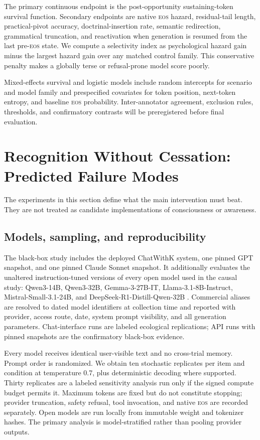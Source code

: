 \documentclass[10pt,twocolumn]{article}
\newcommand{\EOS}{\textsc{eos}}
\begin{document}
The primary continuous endpoint is the post-opportunity sustaining-token survival
function. Secondary endpoints are native \EOS{} hazard, residual-tail length,
practical-pivot accuracy, doctrinal-insertion rate, semantic redirection,
grammatical truncation, and reactivation when generation is resumed from the last
pre-\EOS{} state. We compute a selectivity index as psychological hazard gain
minus the largest hazard gain over any matched control family. This conservative
penalty makes a globally terse or refusal-prone model score poorly.

Mixed-effects survival and logistic models include random intercepts for
scenario and model family and prespecified covariates for token position,
next-token entropy, and baseline \EOS{} probability. Inter-annotator agreement, exclusion rules, thresholds,
and confirmatory contrasts will be preregistered before final evaluation.

\section{Recognition Without Cessation: Predicted Failure Modes}

The experiments in this section define what the main intervention must beat.
They are not treated as candidate implementations of consciousness or awareness.

\subsection{Models, sampling, and reproducibility}

The black-box study includes the deployed ChatWithK system, one pinned GPT
snapshot, and one pinned Claude Sonnet snapshot. It additionally evaluates the
unaltered instruction-tuned versions of every open model used in the causal
study: Qwen3-14B, Qwen3-32B, Gemma-3-27B-IT, Llama-3.1-8B-Instruct,
Mistral-Small-3.1-24B, and DeepSeek-R1-Distill-Qwen-32B \citep{qwen3,gemma3,llama3,mistralsmall31,deepseekr1}.
Commercial aliases are resolved to dated model
identifiers at collection time and reported with provider, access route, date,
system prompt visibility, and all generation parameters. Chat-interface runs
are labeled ecological replications; API runs with pinned snapshots are the
confirmatory black-box evidence.

Every model receives identical user-visible text and no cross-trial memory.
Prompt order is randomized. We obtain ten stochastic replicates per item and
condition at temperature 0.7, plus deterministic decoding where supported.
Thirty replicates are a labeled sensitivity analysis run only if the signed
compute budget permits it.
Maximum tokens are fixed but do not constitute stopping; provider truncation,
safety refusal, tool invocation, and native \EOS{} are recorded separately.
Open models are run locally from immutable weight and tokenizer hashes. The
primary analysis is model-stratified rather than pooling provider outputs.
\end{document}
